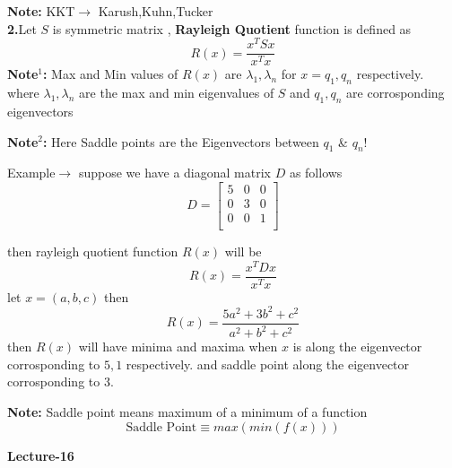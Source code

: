 \documentclass[a4paper]{article}
\numberwithin{equation}{section}
\begin{document}
\begin{itemize}
\textbf{Note: }KKT$\rightarrow$ Karush,Kuhn,Tucker\\

\textbf{2.}Let $S$ is symmetric matrix , \textbf{Rayleigh Quotient} function is defined as
\[R(x)=\frac{x^TSx}{x^Tx}\]
\textbf{Note$^1$:} Max and Min values of $R(x)$ are $\lambda_1,\lambda_n$ for $x=q_1,q_n$ respectively. where $\lambda_1,\lambda_n$ are the max and min eigenvalues of $S$ and $q_1,q_n$ are corrosponding eigenvectors

\textbf{Note$^2$:} Here Saddle points are the Eigenvectors between $q_1$ \& $q_n$!

Example$\rightarrow$ suppose we have a diagonal matrix $D$ as follows
\[D=\begin{bmatrix}
    5&0&0\\
    0&3&0\\
    0&0&1\\
\end{bmatrix}\]

then rayleigh quotient function $R(x)$ will be
\[R(x)=\frac{x^TDx}{x^Tx}\]
let $x=(a,b,c)$ then 
\[R(x)=\frac{5a^2+3b^2+c^2}{a^2+b^2+c^2}\]
then $R(x)$ will have minima and maxima when $x$ is along the eigenvector corrosponding to $5,1$ respectively. and saddle point along the eigenvector corrosponding to $3$.

\textbf{Note: }Saddle point means maximum of a minimum of a function
\[\text{Saddle Point}\equiv max(min(f(x)))\]

\begin{center}
    \textbf{\Huge{Lecture-16}}
\end{center}


\end{itemize}
\end{document}
